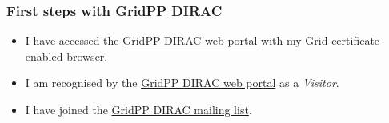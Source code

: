 \subsubsection{First steps with GridPP DIRAC}
\label{first-steps-with-gridpp-dirac}

\begin{itemize}
\tightlist
\item
  I have accessed the \href{https://dirac.gridpp.ac.uk}{GridPP DIRAC web
  portal} with my Grid certificate-enabled browser.
\item
  I am recognised by the \href{https://dirac.gridpp.ac.uk}{GridPP DIRAC
  web portal} as a \emph{Visitor}.
\item
  I have joined the
  \href{https://mailman.ic.ac.uk/mailman/listinfo/gridpp-dirac-users}{GridPP
  DIRAC mailing list}.
\end{itemize}

